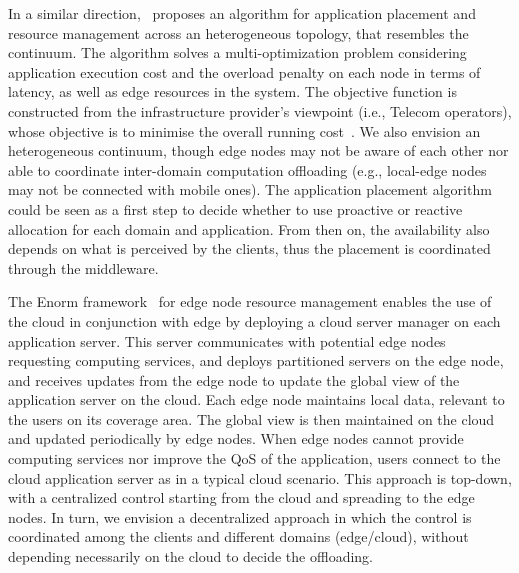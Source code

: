 
In a similar direction,~\cite{Tarneberg2017} proposes an algorithm for application placement and resource management across an heterogeneous topology, that resembles the continuum. 
The algorithm solves a multi-optimization problem considering application
execution cost and the overload penalty on each node in terms of latency, as well as edge
resources in the system. The objective function is constructed
from the infrastructure provider’s viewpoint (i.e., Telecom operators), whose objective is to
minimise the overall running cost~\cite{weber2017facilitating}. We also envision an heterogeneous continuum, though edge nodes may not be aware of each other nor able to coordinate inter-domain computation offloading (e.g., local-edge nodes may not be connected with mobile ones). The application placement algorithm could be seen as a first step to decide whether to use proactive or reactive allocation for each domain and application. From then on, the availability also depends on what is perceived by the clients, thus the placement is coordinated through the middleware. 

The Enorm framework~\cite{wang2017enorm} for edge node resource management enables the use of the cloud in conjunction with edge
by deploying a cloud server manager on
each application server. This server communicates with
potential edge nodes requesting computing services, and
deploys partitioned servers on the edge node, and receives updates from the edge node to update the global view of the application server on the cloud. Each edge node maintains local data, relevant to the users on its coverage area. The global view is then maintained on the cloud and updated periodically by edge nodes. When edge nodes cannot provide computing services nor improve the QoS of the application, users connect to the cloud application server as in a typical cloud scenario. This approach is top-down, with a centralized control starting from the cloud and spreading to the edge nodes. In turn, we envision a decentralized approach in which the control is coordinated among the clients and different domains (edge/cloud), without depending necessarily on the cloud to decide the offloading. %


